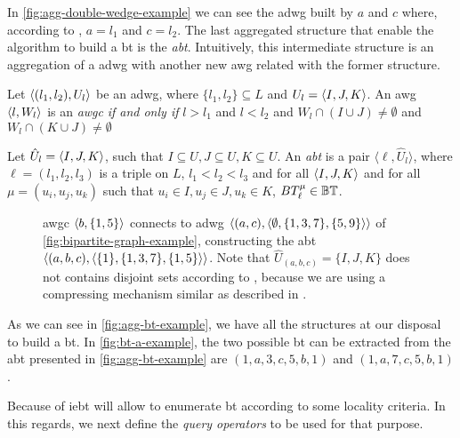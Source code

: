 In \autoref{fig:agg-double-wedge-example} we can see the \acrshort{adwg} built by $a$ and $c$ where, according to , $a = l_1$ and $c = l_2$.
The last aggregated structure that enable the algorithm to build a \acrshort{bt} is the \emph{\acrlong{abt}}. 
Intuitively, this intermediate structure is an aggregation of a \acrshort{adwg} with another new \acrshort{awg} related with the former structure.

\begin{definition}\label{def:awgc}
Let $\left\langle (l_1, l_2), U_l \right\rangle$ be an \acrshort{adwg}, where $\{l_1,l_2\}\subseteq L$ and $U_l = \left\langle I, J, K\right\rangle$.
An \acrshort{awg} $\left\langle l, W_l \right\rangle$ is an \textit{\acrfull{awgc}} \emph{if and only if} $l > l_1$ and $l < l_2$ and $W_l \cap (I \cup J) \neq \emptyset$ and $W_l \cap (K \cup J) \neq \emptyset$
\end{definition}
      
\begin{definition}\label{def:abt}
Let $\hat{U}_l=\left\langle I, J, K\right\rangle$, such that $I \subseteq U, J \subseteq U, K \subseteq U$. An \textit{\acrfull{abt}}  is a pair  $\langle \ell, \hat{U}_l\rangle$, 
where $\ell=(l_1, l_2, l_3)$ is a triple on $L$, $l_1 < l_2 < l_3$ and for all $\left\langle I, J, K\right\rangle$ and for all $\mu=(u_i, u_j, u_k)$ such that $u_i \in I, u_j \in J, u_k \in K$, $BT_{\ell}^{\mu}\in \mathbb{BT}$.
\end{definition}
      
\begin{figure}[h!]
\centering      
{}
\caption[{[\acrshort{iebt}] Example Aggregated bitriangle}]{%
\acrlong{awgc} $\left\langle b, \{1,5\}\right\rangle$ connects to \acrlong{adwg} $\left\langle (a,c), \left\langle \emptyset, \{1,3,7\}, \{5,9\}\right\rangle \right\rangle$ of \autoref{fig:bipartite-graph-example}, constructing the \acrlong{abt} $\left\langle (a,b,c), \left\langle \{1\},\{1,3,7\},\{1,5\} \right\rangle \right\rangle$.
Note that $\hat{U}_{(a,b,c)}=\{I,J,K\}$ does not contains disjoint sets according to , because we are using a compressing mechanism similar as described in \cite{Lai}. 
}
\label{fig:agg-bt-example}
\end{figure}
      
As we can see in \autoref{fig:agg-bt-example}, we have all the structures at our disposal to build a \acrshort{bt}. 
In \autoref{fig:bt-a-example}, the two possible \acrshort{bt} can be extracted from the \acrshort{abt} presented in \autoref{fig:agg-bt-example} are $(1,a,3,c,5,b,1)$ and $(1,a,7,c,5,b,1)$.

Because of \acrshort{iebt} will allow to enumerate \acrshort{bt} according to some locality criteria.
In this regards, we next define the \emph{query operators} to be used for that purpose.

